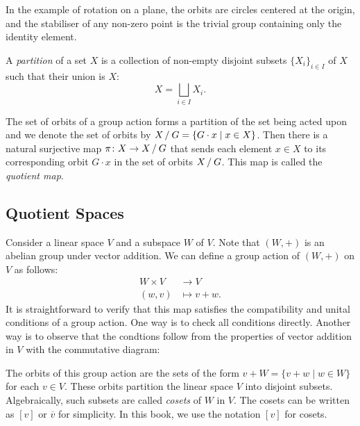In the example of rotation on a plane, the orbits are circles centered at the origin, and the stabiliser of any non-zero point is the trivial group containing only the identity element.

\begin{definition}[Partition]\label{def:partition}
  A \emph{partition} of a set $X$ is a collection of non-empty disjoint subsets ${\{ X_i \}}_{i \in I}$ of $X$ such that their union is $X$:
  \[
    X = \bigsqcup_{i \in I} X_i.
  \]
\end{definition}

The set of orbits of a group action forms a partition of the set being acted upon and we denote the set of orbits by $X \mathbin{/} G = \{ G \cdot x \mid x \in X \}$. Then there is a natural surjective map $\pi \colon X \to X \mathbin{/} G$ that sends each element $x \in X$ to its corresponding orbit $G \cdot x$ in the set of orbits $X \mathbin{/} G$. This map is called the \emph{quotient map}.

\subsection{Quotient Spaces}

Consider a linear space $V$ and a subspace $W$ of $V$. Note that $(W, +)$ is an abelian group under vector addition. We can define a group action of $(W, +)$ on $V$ as follows:
\begin{align*}
  W \times V & \to V          \\
  (w, v)     & \mapsto v + w.
\end{align*}
It is straightforward to verify that this map satisfies the compatibility and unital conditions of a group action. One way is to check all conditions directly. Another way is to observe that the condtions follow from the properties of vector addition in $V$ with the commutative diagram:
\begin{center}
\end{center}
The orbits of this group action are the sets of the form $v + W = \{ v + w \mid w \in W \}$ for each $v \in V$. These orbits partition the linear space $V$ into disjoint subsets. Algebraically, such subsets are called \emph{cosets} of $W$ in $V$. The cosets can be written as $[v]$ or $\overline{v}$ for simplicity. In this book, we use the notation $[v]$ for cosets.

